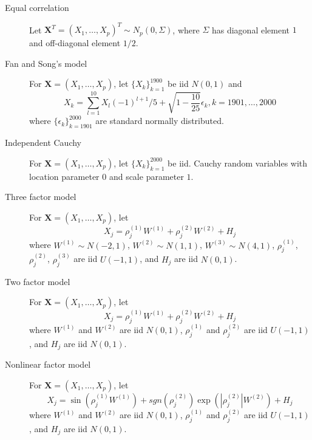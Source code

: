 \documentclass[]{article}
\begin{document}
\begin{description}
    \item [Equal correlation] Let $\mathbf{X}^T = (X_{1}, \dots , X_{p})^T \sim N_p(0, \Sigma)$, where $\Sigma$ has diagonal element $1$ and off-diagonal element $1/2$.

    \item [Fan and Song's model] For $\mathbf{X} = (X_{1}, \dots , X_{p})$, let $\{X_k\}^{1900}_{k=1}$ be iid $N(0,1)$ and
    \begin{equation}
        X_{k}=\sum_{l=1}^{10} X_{l}(-1)^{l+1} / 5+\sqrt{1-\frac{10}{25}} \epsilon_{k}, k=1901, \ldots, 2000
    \end{equation}
    where $\{\epsilon_{k}\}^{2000}_{k=1901}$ are standard normally distributed.

    \item [Independent Cauchy] For $\mathbf{X} = (X_{1}, \dots , X_{p})$, let $\{X_k\}^{2000}_{k=1}$ be iid. Cauchy random variables with location parameter $0$ and scale parameter $1$.

    \item [Three factor model] For $\mathbf{X} = (X_{1}, \dots , X_{p})$, let 
    \begin{equation}
        X_{j}=\rho_{j}^{(1)} W^{(1)}+\rho_{j}^{(2)} W^{(2)}+H_{j}
    \end{equation}
    where $W^{(1)} \sim N(−2,1)$, $W^{(2)} \sim N(1,1)$, $W^{(3)} \sim N(4,1)$, $\rho^{(1)}_j$, $\rho^{(2)}_j$, $\rho^{(3)}_j$ are iid $U(−1,1)$, and $H_j$ are iid $N(0,1)$.

    \item [Two factor model] For $\mathbf{X} = (X_{1}, \dots , X_{p})$, let
    \begin{equation}
        X_{j}=\rho_{j}^{(1)} W^{(1)}+\rho_{j}^{(2)} W^{(2)}+H_{j}
    \end{equation}
    where $W^{(1)}$ and $W^{(2)}$ are iid $N(0,1)$, $\rho_j^{(1)}$ and $\rho_j^{(2)}$ are iid $U(−1,1)$, and $H_j$ are iid $N(0,1)$. 

    \item [Nonlinear factor model] For $\mathbf{X} = (X_{1}, \dots , X_{p})$, let
    \begin{equation}
        X_{j}=\sin \left(\rho_{j}^{(1)} W^{(1)}\right)+sgn\left(\rho_{j}^{(2)}\right) \exp \left(\left|\rho_{j}^{(2)}\right| W^{(2)}\right)+H_{j}
    \end{equation}
    where $W^{(1)}$ and $W^{(2)}$ are iid $N(0,1)$, $\rho_j^{(1)}$ and $\rho_j^{(2)}$ are iid $U(−1,1)$, and $H_j$ are iid $N(0,1)$. 
\end{description}
\end{document}
